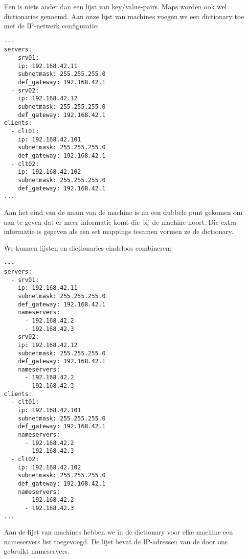 Een  is niets ander dan een lijst van key/value-pairs. Maps worden ook wel dictionaries genoemd. Aan onze lijst van machines voegen we een dictionary toe met de IP-netwerk configuratie:
\begin{verbatim}
---
servers:
  - srv01:
    ip: 192.168.42.11
    subnetmask: 255.255.255.0
    def_gateway: 192.168.42.1
  - srv02:
    ip: 192.168.42.12
    subnetmask: 255.255.255.0
    def_gateway: 192.168.42.1
clients:
  - clt01:
    ip: 192.168.42.101
    subnetmask: 255.255.255.0
    def_gateway: 192.168.42.1
  - clt02:
    ip: 192.168.42.102
    subnetmask: 255.255.255.0
    def_gateway: 192.168.42.1
...
\end{verbatim}
Aan het eind van de naam van de machine is nu een dubbele punt gekomen om aan te geven dat er meer informatie komt die bij de machine hoort. Die extra informatie is gegeven als een set mappings tesamen vormen ze de dictionary.

We kunnen lijsten en dictionaries eindeloos combineren:
\begin{verbatim}
---
servers:
  - srv01:
    ip: 192.168.42.11
    subnetmask: 255.255.255.0
    def_gateway: 192.168.42.1
    nameservers:
      - 192.168.42.2
      - 192.168.42.3
  - srv02:
    ip: 192.168.42.12
    subnetmask: 255.255.255.0
    def_gateway: 192.168.42.1
    nameservers:
      - 192.168.42.2
      - 192.168.42.3
clients:
  - clt01:
    ip: 192.168.42.101
    subnetmask: 255.255.255.0
    def_gateway: 192.168.42.1
    nameservers:
      - 192.168.42.2
      - 192.168.42.3
  - clt02:
    ip: 192.168.42.102
    subnetmask: 255.255.255.0
    def_gateway: 192.168.42.1
    nameservers:
      - 192.168.42.2
      - 192.168.42.3
...
\end{verbatim}
Aan de lijst van machines hebben we in de dictionary voor elke machine een nameservers list toegevoegd. De lijst bevat de IP-adressen van de door ons gebruikt nameservers.

